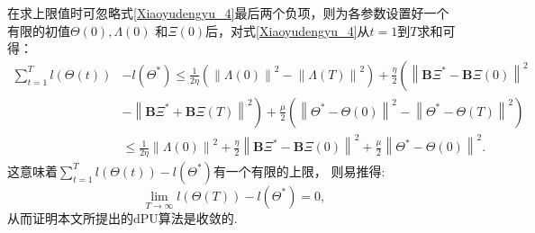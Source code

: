 在求上限值时可忽略式\eqref{Xiaoyudengyu_4}最后两个负项，则为各参数设置好一个有限的初值$\boldsymbol\varTheta\left(0\right),\boldsymbol\varLambda\left(0\right)$
和$\boldsymbol \varXi\left(0\right)$后，对式\eqref{Xiaoyudengyu_4}从$t=1$到$T$求和可得：
\begin{equation}\label{Xiaoyudengyu_final}
    \begin{split}
        \sum \limits_{t=1}^T l\left(\boldsymbol{\varTheta} \left(t\right)\right) &- l\left(\boldsymbol{\varTheta}^{*} \right) 
        \leq \frac{1}{2\eta} \left( \left\| \boldsymbol \varLambda \left(0\right)\right\|^2 
        - \left\| \boldsymbol \varLambda \left(T\right)\right\|^2 \right)  
        + \frac{\eta}{2} \left( \left\|\boldsymbol B\boldsymbol \varXi^* - \boldsymbol B\boldsymbol \varXi\left(0\right)\right\|^2 \right. \\
        & \left. - \left\|\boldsymbol B\boldsymbol \varXi^* + \boldsymbol B\boldsymbol \varXi\left(T\right)\right\|^2  \right) 
        + \frac{\mu}{2} \left( \left\| \boldsymbol\varTheta^* - \boldsymbol\varTheta\left(0\right)\right\|^2 
        - \left\| \boldsymbol\varTheta^* - \boldsymbol\varTheta\left(T\right)\right\|^2\right)  \\
        &\leq \frac{1}{2\eta} \left\| \boldsymbol \varLambda \left(0\right)\right\|^2
        +\frac{\eta}{2} \left\|\boldsymbol B\boldsymbol \varXi^* - \boldsymbol B\boldsymbol \varXi\left(0\right)\right\|^2 
        +\frac{\mu}{2} \left\| \boldsymbol\varTheta^* - \boldsymbol\varTheta\left(0\right)\right\|^2.
    \end{split}
\end{equation}
这意味着$\sum \limits_{t=1}^T l\left(\boldsymbol{\varTheta} \left(t\right)\right) - l\left(\boldsymbol{\varTheta}^{*} \right)$有一个有限的上限，
则易推得:
\begin{equation}
    \mathop {\lim }\limits_{T \to \infty } l\left(\boldsymbol{\varTheta} \left(T\right)\right) - l\left(\boldsymbol{\varTheta}^{*} \right)=0,
\end{equation}
从而证明本文所提出的dPU算法是收敛的.


